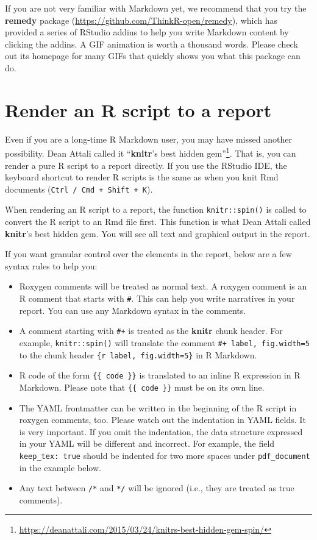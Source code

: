 \documentclass[
  11pt,
]{krantz}
\renewcommand{\href}[2]{#2\footnote{\url{#1}}}
\begin{document}
If you are not very familiar with Markdown yet, we recommend that you try the \textbf{remedy} package (\url{https://github.com/ThinkR-open/remedy}), which has provided a series of RStudio addins to help you write Markdown content by clicking the addins. A GIF animation is worth a thousand words. Please check out its homepage for many GIFs that quickly shows you what this package can do.

\hypertarget{spin}{%
\section{Render an R script to a report}\label{spin}}

Even if you are a long-time R Markdown user, you may have missed another possibility. Dean Attali called it \href{https://deanattali.com/2015/03/24/knitrs-best-hidden-gem-spin/}{``\textbf{knitr}'s best hidden gem''}. That is, you can render a pure R script to a report directly. If you use the RStudio IDE, the keyboard shortcut to render R scripts is the same as when you knit Rmd documents (\texttt{Ctrl\ /\ Cmd\ +\ Shift\ +\ K}).

When rendering an R script to a report, the function \texttt{knitr::spin()} is called to convert the R script to an Rmd file first. This function is what Dean Attali called \textbf{knitr}'s best hidden gem. You will see all text and graphical output in the report.

If you want granular control over the elements in the report, below are a few syntax rules to help you:

\begin{itemize}
\item
  Roxygen comments will be treated as normal text. A roxygen comment is an R comment that starts with \texttt{\#\textquotesingle{}}. This can help you write narratives in your report. You can use any Markdown syntax in the comments.
\item
  A comment starting with \texttt{\#+} is treated as the \textbf{knitr} chunk header. For example, \texttt{knitr::spin()} will translate the comment \texttt{\#+\ label,\ fig.width=5} to the chunk header \texttt{\textasciigrave{}\textasciigrave{}\textasciigrave{}\{r\ label,\ fig.width=5\}} in R Markdown.
\item
  R code of the form \texttt{\{\{\ code\ \}\}} is translated to an inline R expression in R Markdown. Please note that \texttt{\{\{\ code\ \}\}} must be on its own line.
\item
  The YAML frontmatter can be written in the beginning of the R script in roxygen comments, too. Please watch out the indentation in YAML fields. It is very important. If you omit the indentation, the data structure expressed in your YAML will be different and incorrect. For example, the field \texttt{keep\_tex:\ true} should be indented for two more spaces under \texttt{pdf\_document} in the example below.
\item
  Any text between \texttt{/*} and \texttt{*/} will be ignored (i.e., they are treated as true comments).
\end{itemize}
\end{document}
